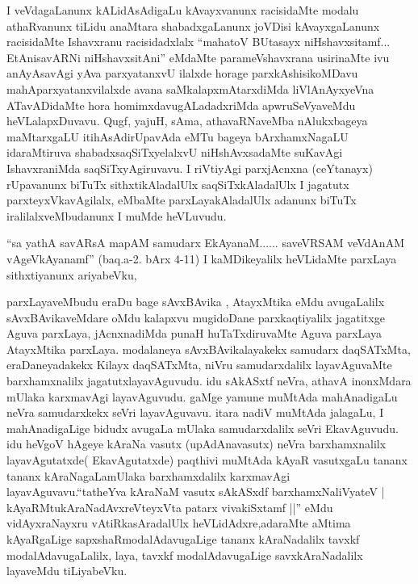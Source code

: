 \begin{artha}
I veVdagaLanunx kALidAsAdigaLu kAvayxvanunx racisidaMte modalu
athaRvanunx tiLidu anaMtara shabadxgaLanunx joVDisi kAvayxgaLanunx
racisidaMte Ishavxranu racisidadxlalx ``mahatoV BUtasayx niHshavxsitamf... EtAnisavARNi niHshavxsitAni'' eMdaMte
\break parameVshavxrana usirinaMte ivu anAyAsavAgi yAva parxyatanxvU ilalxde
horage parxkAshisikoMDavu mahAparxyatanxvilalxde avana
saMkalapxmAtarxdiMda liVlAnAyxyeVna ATavADidaMte hora
homimxdavugALadadxriMda apwruSeVyaveMdu heVLalapxDu\-vavu. Qugf, yajuH,
sAma, athavaRNaveMba nAlukxbageya maMtarxgaLU iti\-hAsAdirUpavAda eMTu
bageya bArxhamxNagaLU idaraMtiruva shabadxsaqSiTxyelalxvU
niHshAvxsadaMte suKavAgi IshavxraniMda saqSiTxyAgiruvavu. I riVtiyAgi
\-parxjAcnxna (ceYtanayx) rUpavanunx biTuTx sithxtikAladalUlx
saqSiTxkAladalUlx I jagatutx parxteyxVka\-vAgilalx, eMbaMte
parxLayakAladalUlx adanunx biTuTx iralilalxveMbudanunx I muMde
heVLuvudu. 
\end{artha}

\begin{artha}
``sa yathA savARsA mapAM samudarx EkAyanaM...... saveVRSAM veVdAnAM vAgeVkAyanamf'' (baq.a-2. bArx 4-11) I kaMDikeyalilx heVLidaMte parxLaya
 sithxtiyanunx ariyabeVku,
\end{artha}

\centerline{ }

\begin{artha}
parxLayaveMbudu eraDu bage sAvxBAvika , AtayxMtika eMdu avugaLalilx
\break sAvxBAvikaveMdare oMdu kalapxvu mugidoDane parxkaqtiyalilx jagatitxge
Aguva parxLaya, jAcnxnadiMda punaH huTaTxdiruvaMte Aguva parxLaya
AtayxMtika parxLaya. modalaneya sAvxBAvikalayakekx samudarx
daqSATxMta, eraDaneyadakekx Kilayx daqSATxMta, niVru \break samudarxdalilx
layavAguvaMte barxhamxnalilx jagatutxlayavAguvudu. idu sAkASxtf neVra, athavA
inonxMdara mUlaka karxmavAgi layavAguvudu. gaMge yamune muMtAda
mahAnadigaLu neVra samudarxkekx seVri layavAguvavu. itara nadiV
\-muMtAda jalagaLu, I mahAnadigaLige bidudx avugaLa mUlaka
samudarxdalilx seVri EkavAguvudu. idu heVgoV hAgeye kAraNa vasutx
(upAdAnavasutx) neVra barxhamx\-nalilx layavAgutatxde( EkavAgutatxde)
paqthivi muMtAda kAyaR vasutxgaLu tananx tananx kAraNagaLamUlaka
barxhamxdalilx karxmavAgi layavAguvavu.``tatheYva kAraNaM \-vasutx sAkASxdf barxhamxNaliVyateV | kAyaRMtukAraNadAvxreVteyxVta patarx vivakiSxtamf ||'' eMdu vidAyxraNayxru
vAtiRkasAradalUlx heVLidAdxre,adaraMte aMtima kAyaRgaLige
sapxshaRmodalAdavugaLige tananx kAraNadalilx tavxkf
modalAdavugaLalilx, laya, tavxkf modalAdavugaLige savxkAraNadalilx
layaveMdu tiLiyabeVku.
\end{artha}

